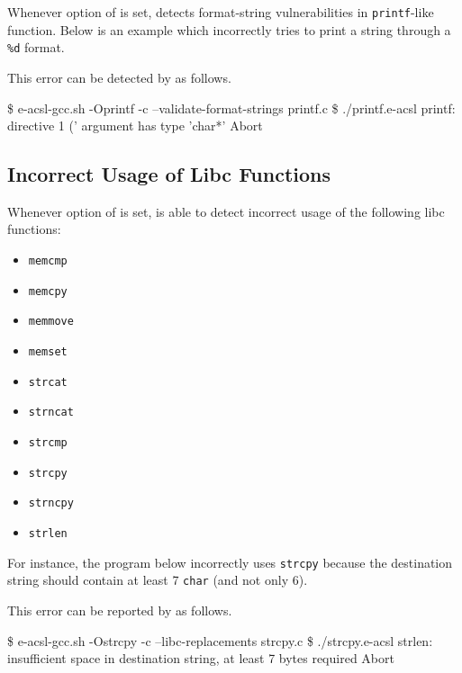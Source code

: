 Whenever option  of \eacslgcc is set, \eacsl
detects format-string vulnerabilities in \texttt{printf}-like function. Below is
an example which incorrectly tries to print a string through a \texttt{\%d}
format.


This error can be detected by \eacsl as follows.

\begin{logs}
\$ e-acsl-gcc.sh -Oprintf -c --validate-format-strings printf.c
\$ ./printf.e-acsl
printf: directive 1 ('%
argument has type 'char*'
Abort
\end{logs}

\subsection{Incorrect Usage of Libc Functions}

Whenever option  of \eacslgcc is set, \eacsl is
able to detect incorrect usage of the following libc functions:
\begin{itemize}
  \item \texttt{memcmp}
  \item \texttt{memcpy}
  \item \texttt{memmove}
  \item \texttt{memset}
  \item \texttt{strcat}
  \item \texttt{strncat}
  \item \texttt{strcmp}
  \item \texttt{strcpy}
  \item \texttt{strncpy}
  \item \texttt{strlen}
\end{itemize}

For instance, the program below incorrectly uses \texttt{strcpy} because the
destination string should contain at least 7 \texttt{char} (and not only 6).


This error can be reported by \eacsl as follows.

\begin{logs}
\$ e-acsl-gcc.sh -Ostrcpy -c --libc-replacements strcpy.c
\$ ./strcpy.e-acsl
strlen: insufficient space in destination string, at least 7 bytes required
Abort
\end{logs}

